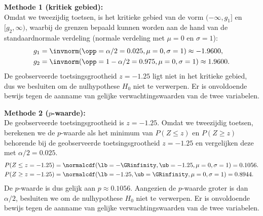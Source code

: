 {    {\noindent\bfseries Methode 1 (kritiek gebied):}\\
    Omdat we tweezijdig toetsen, is het kritieke gebied van de vorm $(-\infty, g_1]$ en $[g_2, \infty)$, waarbij de grenzen bepaald kunnen worden aan de hand 
    van de standaardnormale verdeling (normale verdeling met $\mu = 0$ en $\sigma=1$):
    \begin{align*}
        g_1 &= \invnorm(\opp=\alpha/2=0.025, \mu=0, \sigma=1) \approx -1.9600, \\
        g_2 &= \invnorm(\opp=1-\alpha/2=0.975, \mu=0, \sigma=1) \approx 1.9600.
    \end{align*}
    De geobserveerde toetsingsgrootheid $z = -1.25$ ligt niet in het kritieke gebied, dus we besluiten om de nulhypothese $H_0$ niet te verwerpen.
    Er is onvoldoende bewijs tegen de aanname van gelijke verwachtingswaarden van de twee variabelen.\\
    \medskip

    {\noindent\bfseries Methode 2 ($p$-waarde):}\\
    De geobserveerde toetsingsgrootheid is $z = -1.25$.
    Omdat we tweezijdig toetsen, berekenen we de $p$-waarde als het minimum van $P(Z \leq z)$ en $P(Z \geq z)$ behorende bij de geobserveerde toetsingsgrootheid $z=-1.25$ en vergelijken deze met $\alpha/2 = 0.025$.
    \begin{align*}
        P(Z \leq z=-1.25) &= \normalcdf(\lb=-\GRinfinity, \ub=-1.25, \mu = 0, \sigma = 1) = 0.1056. \\
        P(Z \geq z=-1.25) &= \normalcdf(\lb=-1.25, \ub=\GRinfinity, \mu = 0, \sigma = 1) = 0.8944.
    \end{align*}
    De $p$-waarde is dus gelijk aan $p \approx 0.1056$.
    Aangezien de $p$-waarde groter is dan $\alpha/2$, besluiten we om de nulhypothese $H_0$ niet te verwerpen.
    Er is onvoldoende bewijs tegen de aanname van gelijke verwachtingswaarden van de twee variabelen.
}